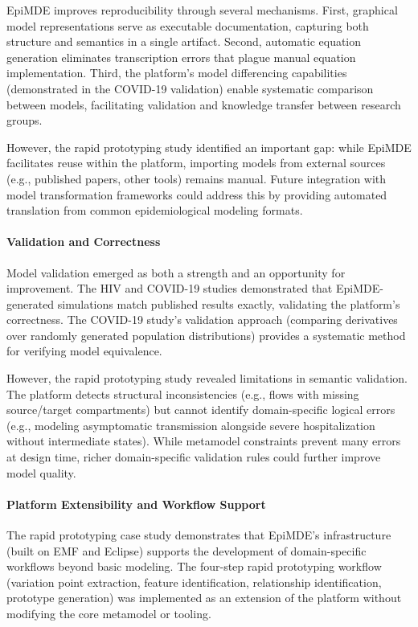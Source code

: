EpiMDE improves reproducibility through several mechanisms. First, graphical model representations serve as executable documentation, capturing both structure and semantics in a single artifact. Second, automatic equation generation eliminates transcription errors that plague manual equation implementation. Third, the platform's model differencing capabilities (demonstrated in the COVID-19 validation) enable systematic comparison between models, facilitating validation and knowledge transfer between research groups.

However, the rapid prototyping study identified an important gap: while EpiMDE facilitates reuse within the platform, importing models from external sources (e.g., published papers, other tools) remains manual. Future integration with model transformation frameworks could address this by providing automated translation from common epidemiological modeling formats.

\paragraph{Validation and Correctness}

Model validation emerged as both a strength and an opportunity for improvement. The HIV and COVID-19 studies demonstrated that EpiMDE-generated simulations match published results exactly, validating the platform's correctness. The COVID-19 study's validation approach (comparing derivatives over randomly generated population distributions) provides a systematic method for verifying model equivalence.

However, the rapid prototyping study revealed limitations in semantic validation. The platform detects structural inconsistencies (e.g., flows with missing source/target compartments) but cannot identify domain-specific logical errors (e.g., modeling asymptomatic transmission alongside severe hospitalization without intermediate states). While metamodel constraints prevent many errors at design time, richer domain-specific validation rules could further improve model quality.

\paragraph{Platform Extensibility and Workflow Support}

The rapid prototyping case study demonstrates that EpiMDE's infrastructure (built on EMF and Eclipse) supports the development of domain-specific workflows beyond basic modeling. The four-step rapid prototyping workflow (variation point extraction, feature identification, relationship identification, prototype generation) was implemented as an extension of the platform without modifying the core metamodel or tooling.


